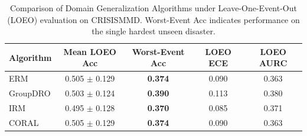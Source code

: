 \begin{table}[t]
\centering
\caption{Comparison of Domain Generalization Algorithms under Leave-One-Event-Out (LOEO) evaluation on CRISISMMD. Worst-Event Acc indicates performance on the single hardest unseen disaster.}
\label{tab:dg_benchmark_crisismmd}
\begin{tabular}{lcccc}
\toprule
\textbf{Algorithm} & \textbf{Mean LOEO Acc} & \textbf{Worst-Event Acc} & \textbf{LOEO ECE} & \textbf{LOEO AURC} \\
\midrule
ERM & 0.505 $\pm$ 0.129 & \textbf{0.374} & 0.090 & 0.363 \\
GroupDRO & 0.503 $\pm$ 0.124 & \textbf{0.390} & 0.113 & 0.380 \\
IRM & 0.495 $\pm$ 0.128 & \textbf{0.370} & 0.085 & 0.371 \\
CORAL & 0.505 $\pm$ 0.129 & \textbf{0.374} & 0.090 & 0.363 \\
\bottomrule
\end{tabular}
\end{table}
